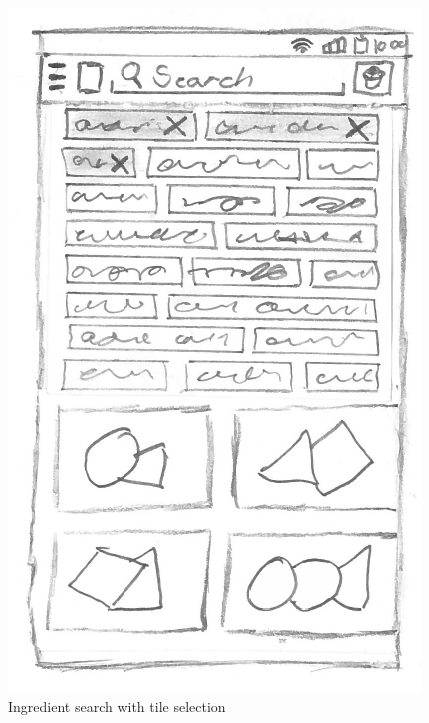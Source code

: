 \begin{figure}[H]
\begin{minipage}[b]{0.5\columnwidth}
\centering
\includegraphics[width=0.7\columnwidth]{../img/prototypes/ingredient_search_tile.pdf}
\caption{Ingredient search with tile selection\label{fig:ingreani}}
\end{minipage}
\hspace{0.5cm}
\begin{minipage}[b]{0.5\columnwidth}
\centering

\end{minipage}
\end{figure}
